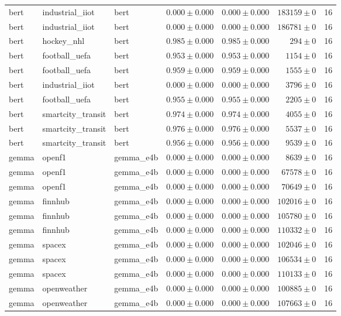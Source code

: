 \begin{table}[htbp]
\begin{tabular}{l l l r r r r}
bert & industrial\_iiot & bert & $0.000\pm0.000$ & $0.000\pm0.000$ & $183159\pm0$ & 16 \\
bert & industrial\_iiot & bert & $0.000\pm0.000$ & $0.000\pm0.000$ & $186781\pm0$ & 16 \\
bert & hockey\_nhl & bert & $0.985\pm0.000$ & $0.985\pm0.000$ & $294\pm0$ & 16 \\
bert & football\_uefa & bert & $0.953\pm0.000$ & $0.953\pm0.000$ & $1154\pm0$ & 16 \\
bert & football\_uefa & bert & $0.959\pm0.000$ & $0.959\pm0.000$ & $1555\pm0$ & 16 \\
bert & industrial\_iiot & bert & $0.000\pm0.000$ & $0.000\pm0.000$ & $3796\pm0$ & 16 \\
bert & football\_uefa & bert & $0.955\pm0.000$ & $0.955\pm0.000$ & $2205\pm0$ & 16 \\
bert & smartcity\_transit & bert & $0.974\pm0.000$ & $0.974\pm0.000$ & $4055\pm0$ & 16 \\
bert & smartcity\_transit & bert & $0.976\pm0.000$ & $0.976\pm0.000$ & $5537\pm0$ & 16 \\
bert & smartcity\_transit & bert & $0.956\pm0.000$ & $0.956\pm0.000$ & $9539\pm0$ & 16 \\
gemma & openf1 & gemma\_e4b & $0.000\pm0.000$ & $0.000\pm0.000$ & $8639\pm0$ & 16 \\
gemma & openf1 & gemma\_e4b & $0.000\pm0.000$ & $0.000\pm0.000$ & $67578\pm0$ & 16 \\
gemma & openf1 & gemma\_e4b & $0.000\pm0.000$ & $0.000\pm0.000$ & $70649\pm0$ & 16 \\
gemma & finnhub & gemma\_e4b & $0.000\pm0.000$ & $0.000\pm0.000$ & $102016\pm0$ & 16 \\
gemma & finnhub & gemma\_e4b & $0.000\pm0.000$ & $0.000\pm0.000$ & $105780\pm0$ & 16 \\
gemma & finnhub & gemma\_e4b & $0.000\pm0.000$ & $0.000\pm0.000$ & $110332\pm0$ & 16 \\
gemma & spacex & gemma\_e4b & $0.000\pm0.000$ & $0.000\pm0.000$ & $102046\pm0$ & 16 \\
gemma & spacex & gemma\_e4b & $0.000\pm0.000$ & $0.000\pm0.000$ & $106534\pm0$ & 16 \\
gemma & spacex & gemma\_e4b & $0.000\pm0.000$ & $0.000\pm0.000$ & $110133\pm0$ & 16 \\
gemma & openweather & gemma\_e4b & $0.000\pm0.000$ & $0.000\pm0.000$ & $100885\pm0$ & 16 \\
gemma & openweather & gemma\_e4b & $0.000\pm0.000$ & $0.000\pm0.000$ & $107663\pm0$ & 16 \\

\end{tabular}
\end{table}
